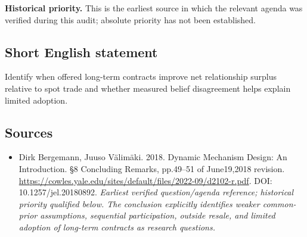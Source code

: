 \documentclass[11pt]{article}
\begin{document}
\par\textbf{Historical priority.} This is the earliest source in which the relevant agenda was verified during this audit; absolute priority has not been established.

\subsection{Short English statement}
Identify when offered long-term contracts improve net relationship surplus relative to spot trade and whether measured belief disagreement helps explain limited adoption.

\subsection{Sources}
\begin{itemize}\raggedright
\item[\textnormal{[S1]}]\hypertarget{source:30007575:1}{} Dirk Bergemann, Juuso Välimäki. 2018. Dynamic Mechanism Design: An Introduction. §8 Concluding Remarks, pp.49–51 of June19,2018 revision.
\url{https://cowles.yale.edu/sites/default/files/2022-09/d2102-r.pdf}.
DOI: 10.1257/jel.20180892.
{\small\textit{Earliest verified question/agenda reference; historical priority qualified below. The conclusion explicitly identifies weaker common-prior assumptions, sequential participation, outside resale, and limited adoption of long-term contracts as research questions.}}
\end{itemize}
\end{document}
